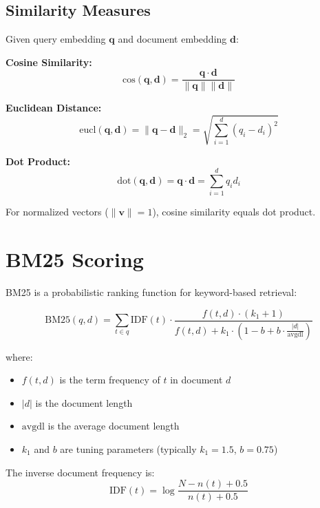 \documentclass{article}
\begin{document}
\subsection{Similarity Measures}

Given query embedding $\mathbf{q}$ and document embedding $\mathbf{d}$:

\textbf{Cosine Similarity:}
\begin{equation}
\text{cos}(\mathbf{q}, \mathbf{d}) = \frac{\mathbf{q} \cdot \mathbf{d}}{\|\mathbf{q}\| \|\mathbf{d}\|}
\end{equation}

\textbf{Euclidean Distance:}
\begin{equation}
\text{eucl}(\mathbf{q}, \mathbf{d}) = \|\mathbf{q} - \mathbf{d}\|_2 = \sqrt{\sum_{i=1}^{d} (q_i - d_i)^2}
\end{equation}

\textbf{Dot Product:}
\begin{equation}
\text{dot}(\mathbf{q}, \mathbf{d}) = \mathbf{q} \cdot \mathbf{d} = \sum_{i=1}^{d} q_i d_i
\end{equation}

For normalized vectors ($\|\mathbf{v}\| = 1$), cosine similarity equals dot product.

\section{BM25 Scoring}

BM25 is a probabilistic ranking function for keyword-based retrieval:

\begin{equation}
\text{BM25}(q, d) = \sum_{t \in q} \text{IDF}(t) \cdot \frac{f(t, d) \cdot (k_1 + 1)}{f(t, d) + k_1 \cdot (1 - b + b \cdot \frac{|d|}{\text{avgdl}})}
\end{equation}

where:
\begin{itemize}
    \item $f(t, d)$ is the term frequency of $t$ in document $d$
    \item $|d|$ is the document length
    \item $\text{avgdl}$ is the average document length
    \item $k_1$ and $b$ are tuning parameters (typically $k_1 = 1.5$, $b = 0.75$)
\end{itemize}

The inverse document frequency is:
\begin{equation}
\text{IDF}(t) = \log \frac{N - n(t) + 0.5}{n(t) + 0.5}
\end{equation}
\end{document}
